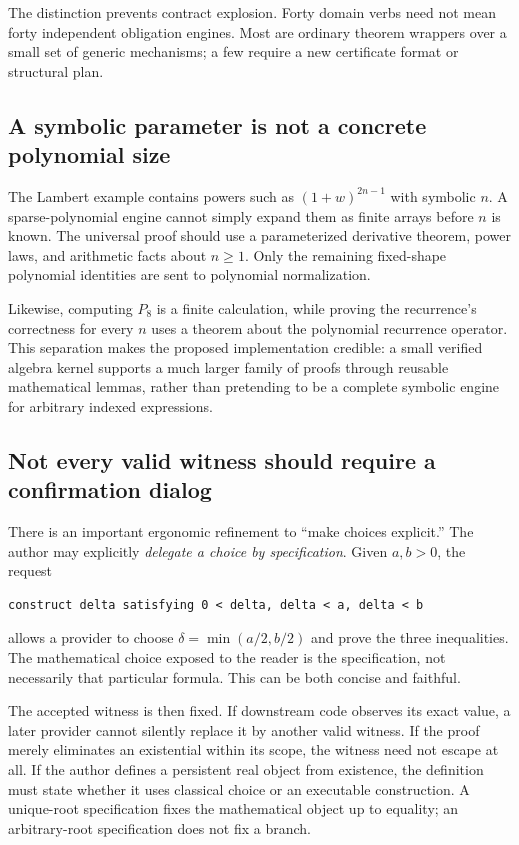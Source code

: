 \documentclass[11pt,a4paper]{article}
\theoremstyle{definition}
\theoremstyle{remark}
\begin{document}
The distinction prevents contract explosion. Forty domain verbs need not mean forty independent obligation engines. Most are ordinary theorem wrappers over a small set of generic mechanisms; a few require a new certificate format or structural plan.

\subsection{A symbolic parameter is not a concrete polynomial size}
The Lambert example contains powers such as $(1+w)^{2n-1}$ with symbolic $n$. A sparse-polynomial engine cannot simply expand them as finite arrays before $n$ is known. The universal proof should use a parameterized derivative theorem, power laws, and arithmetic facts about $n\ge1$. Only the remaining fixed-shape polynomial identities are sent to polynomial normalization.

Likewise, computing $P_8$ is a finite calculation, while proving the recurrence's correctness for every $n$ uses a theorem about the polynomial recurrence operator. This separation makes the proposed implementation credible: a small verified algebra kernel supports a much larger family of proofs through reusable mathematical lemmas, rather than pretending to be a complete symbolic engine for arbitrary indexed expressions.

\subsection{Not every valid witness should require a confirmation dialog}
There is an important ergonomic refinement to ``make choices explicit.'' The author may explicitly \emph{delegate a choice by specification}. Given $a,b>0$, the request
\begin{lstlisting}
construct delta satisfying 0 < delta, delta < a, delta < b
\end{lstlisting}
allows a provider to choose $\delta=\min(a/2,b/2)$ and prove the three inequalities. The mathematical choice exposed to the reader is the specification, not necessarily that particular formula. This can be both concise and faithful.

The accepted witness is then fixed. If downstream code observes its exact value, a later provider cannot silently replace it by another valid witness. If the proof merely eliminates an existential within its scope, the witness need not escape at all. If the author defines a persistent real object from existence, the definition must state whether it uses classical choice or an executable construction. A unique-root specification fixes the mathematical object up to equality; an arbitrary-root specification does not fix a branch.
\end{document}
